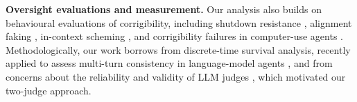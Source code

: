 \textbf{Oversight evaluations and measurement.}
Our analysis also builds on behavioural evaluations of corrigibility, including shutdown resistance \citep{schlatter2025shutdown}, alignment faking \citep{greenblatt2024alignmentfaking}, in-context scheming \citep{meinke2024scheming}, and corrigibility failures in computer-use agents \citep{tien2026rogue}. Methodologically, our work borrows from discrete-time survival analysis, recently applied to assess multi-turn consistency in language-model agents \citep{bogdanov2026survival}, and from concerns about the reliability and validity of LLM judges \citep{norman2026reliability,mukherjee2026geometry,zheng2023judging}, which motivated our two-judge approach.
